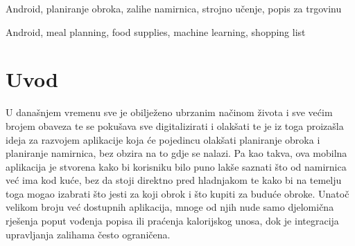 \documentclass[diplomskirad]{fer}
\begin{document}
\begin{kljucnerijeci}
  Android, planiranje obroka, zalihe namirnica, strojno učenje, popis za trgovinu
\end{kljucnerijeci}


\begin{abstract}
  This master's thesis describes an application developed for nutrition management and meal planning. The purpose of the application is to improve meal planning and encourage healthier eating habits by enabling users to keep track of food items and organize their meals more efficiently. Using the application, users can independently plan meals for upcoming days based on the available ingredients, create shopping lists, and manage their food inventory. The thesis also presents a comparison of meal recipe recommendations obtained using a machine learning algorithm and recommendations based on a heuristic approach. Furthermore, it describes the implementation of the application, the method used for synchronizing user data across multiple devices, and the conducted unit and functional tests.

\end{abstract}

\begin{keywords}
  Android, meal planning, food supplies, machine learning, shopping list
\end{keywords}


\tableofcontents


\chapter{Uvod}
\label{pog:uvod}

U današnjem vremenu sve je obilježeno ubrzanim načinom života i sve većim brojem obaveza te se pokušava sve digitalizirati i olakšati te je iz toga proizašla ideja za razvojem aplikacije koja će pojedincu olakšati planiranje obroka i planiranje namirnica, bez obzira na to gdje se nalazi. Pa kao takva, ova mobilna aplikacija je stvorena kako bi korisniku bilo puno lakše saznati što od namirnica već ima kod kuće, bez da stoji direktno pred hladnjakom te kako bi na temelju toga mogao izabrati što jesti za koji obrok i što kupiti za buduće obroke. Unatoč velikom broju već dostupnih aplikacija, mnoge od njih nude samo djelomična rješenja poput vođenja popisa ili praćenja kalorijskog unosa, dok je integracija upravljanja zalihama često ograničena. 
\end{document}
